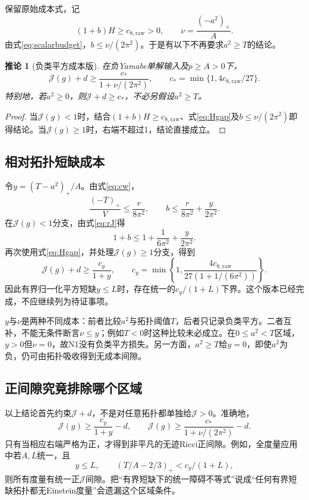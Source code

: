 \documentclass[UTF8,fontset=fandol,zihao=-4,a4paper]{ctexart}
\newtheorem{corollary}[proposition]{推论}
\theoremstyle{remark}
\newcommand{\J}{\mathcal J}
\begin{document}
保留原始成本式，记
\[
(1+b)H\ge c_{8,\mathrm{raw}}>0,
\qquad \nu=\frac{(-a^2)_+}{A}.
\]
由式\eqref{eq:scalarbudget}，$b\le\nu/(2\pi^2)$。于是有以下不再要求$a^2\ge T$的结论。

\begin{corollary}[负类平方成本版]
在负Yamabe单解输入及$p\ge A>0$下，
\begin{equation}
\boxed{\J(g)+d\ge\frac{c_*}{1+\nu/(2\pi^2)},\qquad
c_*=\min\{1,4c_{8,\mathrm{raw}}/27\}.}
\label{eq:nucost}
\end{equation}
特别地，若$a^2\ge0$，则$\J+d\ge c_*$，不必另假设$a^2\ge T$。
\end{corollary}
\begin{proof}
当$\J(g)<1$时，结合$(1+b)H\ge c_{8,\mathrm{raw}}$、式\eqref{eq:Hgap}及$b\le\nu/(2\pi^2)$即得结论。当$\J(g)\ge1$时，右端不超过1，结论直接成立。
\end{proof}

\subsection{相对拓扑短缺成本}

令$y=(T-a^2)_+/A$。由式\eqref{eq:cw}，
\[
\frac{(-T)_+}{V}\le\frac{r}{8\pi^2},\qquad
b\le\frac r{8\pi^2}+\frac y{2\pi^2}.
\]
在$\J(g)<1$分支，由式\eqref{eq:rJ}得
\begin{equation}
1+b\le1+\frac1{6\pi^2}+\frac y{2\pi^2}.
\end{equation}
再次使用式\eqref{eq:Hgap}，并处理$\J(g)\ge1$分支，得到
\begin{equation}
\boxed{\J(g)+d\ge\frac{c_y}{1+y},\qquad
c_y=\min\left\{1,\frac{4c_{8,\mathrm{raw}}}{27(1+1/(6\pi^2))}\right\}.}
\label{eq:ycost}
\end{equation}
因此有界归一化平方短缺$y\le L$时，存在统一的$c_y/(1+L)$下界。这个版本已经完成，不应继续列为待证事项。

$y$与$\nu$是两种不同成本：前者比较$a^2$与拓扑阈值$T$，后者只记录负类平方。二者互补，不能无条件断言$\nu\le y$；例如$T<0$时这种比较未必成立。在$0\le a^2<T$区域，$y>0$但$\nu=0$，故N1没有负类平方损失。另一方面，$a^2\ge T$给$y=0$，即使$a^2$为负，仍可由拓扑吸收得到无成本间隙。

\subsection{正间隙究竟排除哪个区域}
\label{sec:positive}

以上结论首先约束$\J+d$，不是对任意拓扑都单独给$\J>0$。准确地，
\begin{equation}
\J(g)\ge\frac{c_y}{1+y}-d,
\qquad
\J(g)\ge\frac{c_*}{1+\nu/(2\pi^2)}-d.
\label{eq:positiveJ}
\end{equation}
只有当相应右端严格为正，才得到非平凡的无迹Ricci正间隙。例如，全度量应用中若$A,L$统一，且
\[
y\le L,\qquad (T/A-2/3)_+<c_y/(1+L),
\]
则所有度量有统一正$\J$间隙。把“有界短缺下的统一障碍不等式”说成“任何有界短缺拓扑都无Einstein度量”会遗漏这个区域条件。
\end{document}
